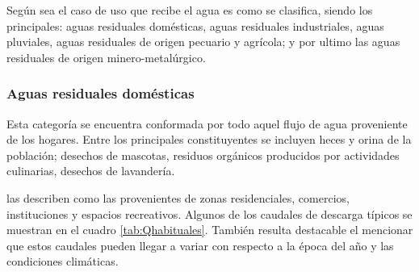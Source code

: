 Según sea el caso de uso que recibe el agua es como se clasifica, siendo los principales: aguas residuales domésticas, aguas residuales industriales, aguas pluviales, aguas residuales de origen pecuario y agrícola; y por ultimo las aguas residuales de origen minero-metalúrgico.\par
\subsubsection*{Aguas residuales domésticas}
Esta categoría se encuentra conformada por todo aquel flujo de agua proveniente de los hogares. Entre los principales constituyentes se incluyen heces y orina de la población; desechos de mascotas, residuos orgánicos producidos por actividades culinarias, desechos de lavandería.\par
\cite{crites2000} las describen como las provenientes de zonas residenciales, comercios, instituciones y espacios recreativos. Algunos de los caudales de descarga típicos se muestran en el cuadro \ref{tab:Qhabituales}. También resulta destacable el mencionar que estos caudales pueden llegar a variar con respecto a la época del año y las condiciones climáticas.\par
